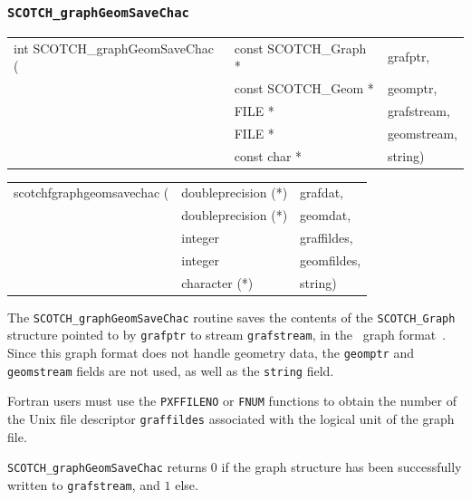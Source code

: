 \subsubsection{{\tt SCOTCH\_graphGeomSaveChac}}

\begin{itemize}
\progsyn

{\tt\begin{tabular}{l@{}ll}
int SCOTCH\_graphGeomSaveChac ( & const SCOTCH\_Graph * & grafptr,    \\
                                & const SCOTCH\_Geom *  & geomptr,    \\
                                & FILE *                & grafstream, \\
                                & FILE *                & geomstream, \\
                                & const char *          & string)
\end{tabular}}

{\tt\begin{tabular}{l@{}ll}
scotchfgraphgeomsavechac ( & doubleprecision (*) & grafdat,    \\
                           & doubleprecision (*) & geomdat,    \\
                           & integer             & graffildes, \\
                           & integer             & geomfildes, \\
                           & character (*)       & string)
\end{tabular}}

\progdes

The {\tt SCOTCH\_graphGeomSaveChac} routine saves the contents
of the {\tt SCOTCH\_\lbt Graph} structure pointed to by {\tt grafptr}
to stream {\tt graf\lbt stream}, in the \chaco\ graph
format~\cite{hele93c}. Since this graph format does
not handle geometry data, the {\tt geomptr} and {\tt geom\lbt stream}
fields are not used, as well as the {\tt string} field.

Fortran users must use the {\tt PXFFILENO} or {\tt FNUM} functions to
obtain the number of the Unix file descriptor {\tt graf\lbt fildes}
associated with the logical unit of the graph file.

\progret

{\tt SCOTCH\_graphGeomSaveChac} returns $0$ if the graph structure
has been successfully written to {\tt graf\lbt stream}, and $1$ else.
\end{itemize}

